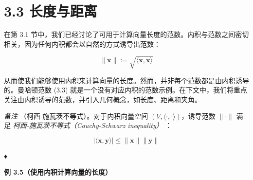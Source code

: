 \section*{3.3 长度与距离}
\label{sec:3.3}

在第 3.1 节中，我们已经讨论了可用于计算向量长度的范数。内积与范数之间密切相关，因为任何内积都会以自然的方式诱导出范数：

\begin{equation}
\|\boldsymbol{x}\| := \sqrt{\langle \boldsymbol{x}, \boldsymbol{x} \rangle}
\tag{3.16}\label{eq:3-16}
\end{equation}

从而使我们能够使用内积来计算向量的长度。然而，并非每个范数都是由内积诱导的。曼哈顿范数 (3.3) 就是一个没有对应内积的范数示例。在下文中，我们将重点关注由内积诱导的范数，并引入几何概念，如长度、距离和夹角。

\emph{备注} （柯西-施瓦茨不等式）。对于内积向量空间 $ (V, \langle \cdot, \cdot \rangle) $，诱导范数 $ \|\cdot\| $ 满足 \emph{柯西-施瓦茨不等式（Cauchy-Schwarz inequality）} ：

\begin{equation}
|\langle \boldsymbol{x}, \boldsymbol{y} \rangle| \leqslant \|\boldsymbol{x}\| \|\boldsymbol{y}\|
\tag{3.17}\label{eq:3-17}
\end{equation}

♦

\begin{notebox}
\textbf{例 3.5（使用内积计算向量的长度）}
\end{notebox}


